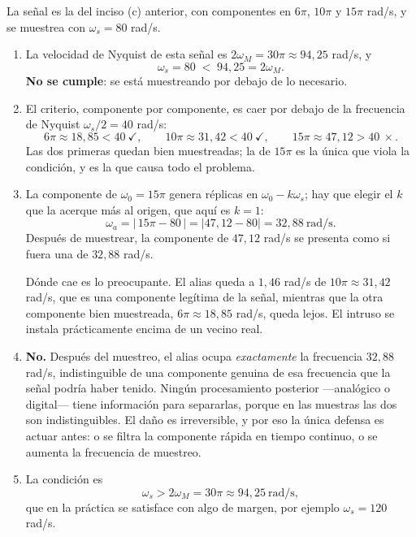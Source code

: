 \documentclass[10pt,a4paper]{article}
\begin{document}
	La señal es la del inciso (c) anterior, con componentes en $6\pi$, $10\pi$ y $15\pi$
	rad/s, y se muestrea con $\omega_s = 80$ rad/s.

	\begin{enumerate}
		\item La velocidad de Nyquist de esta señal es
		$2\omega_M = 30\pi \approx 94{,}25$ rad/s, y
		\[
			\omega_s = 80 \;<\; 94{,}25 = 2\omega_M .
		\]
		\textbf{No se cumple}: se está muestreando por debajo de lo necesario.

		\item El criterio, componente por componente, es
		caer por debajo de la frecuencia de Nyquist $\omega_s/2 = 40$ rad/s:
		\[
			6\pi \approx 18{,}85 < 40 \ \checkmark,
			\qquad
			10\pi \approx 31{,}42 < 40\ \checkmark,
			\qquad
			15\pi \approx 47{,}12 > 40 \ \times .
		\]
		Las dos primeras quedan bien muestreadas; la de $15\pi$ es la única que viola la
		condición, y es la que causa todo el problema.

		\item La componente de $\omega_0 = 15\pi$ genera réplicas
		en $\omega_0 - k\omega_s$; hay que elegir el $k$ que la acerque más al origen, que
		aquí es $k=1$:
		\[
			\omega_a = |\,15\pi - 80\,| = |47{,}12 - 80| = 32{,}88 \ \text{rad/s}.
		\]
		Después de muestrear, la componente de $47{,}12$ rad/s se presenta como si fuera una de
		$32{,}88$ rad/s.

		Dónde cae es lo preocupante. El alias queda a $1{,}46$ rad/s de $10\pi \approx 31{,}42$
		rad/s, que es una componente legítima de la señal, mientras que la otra componente bien
		muestreada, $6\pi \approx 18{,}85$ rad/s, queda lejos. El intruso se instala
		prácticamente encima de un vecino real.

		\item \textbf{No.} Después del muestreo, el alias
		ocupa \emph{exactamente} la frecuencia $32{,}88$ rad/s, indistinguible de una
		componente genuina de esa frecuencia que la señal podría haber tenido. Ningún
		procesamiento posterior ---analógico o digital--- tiene información para separarlas,
		porque en las muestras las dos son indistinguibles. El daño es irreversible, y por eso la
		única defensa es actuar antes: o se filtra la componente rápida en tiempo continuo, o
		se aumenta la frecuencia de muestreo.

		\item La condición es
		\[
			\omega_s > 2\omega_M = 30\pi \approx 94{,}25\ \text{rad/s},
		\]
		que en la práctica se satisface con algo de margen, por ejemplo $\omega_s = 120$ rad/s.
	\end{enumerate}
\end{document}
